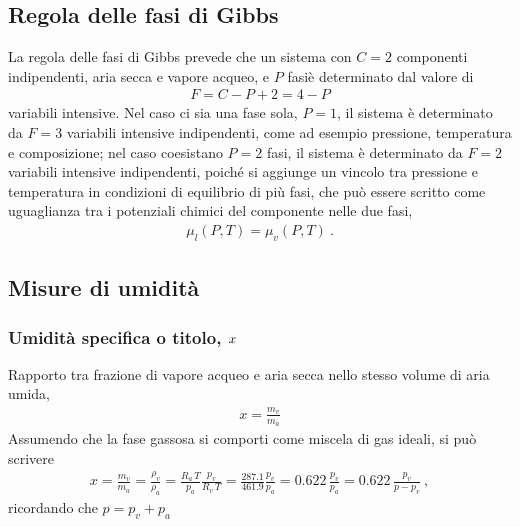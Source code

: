 \documentclass[letterpaper,10pt,italian]{jupyterBook}
\begin{document}
\subsection{Regola delle fasi di Gibbs}
\label{\detokenize{ch/thermodynamics/humid-air:regola-delle-fasi-di-gibbs}}
\sphinxAtStartPar
La regola delle fasi di Gibbs prevede che un sistema con \(C=2\) componenti indipendenti, aria secca e vapore acqueo, e \(P\) fasiè determinato dal valore di
\begin{equation*}
\begin{split}F = C - P + 2 = 4 - P \end{split}
\end{equation*}
\sphinxAtStartPar
variabili intensive. Nel caso ci sia una fase sola, \(P=1\), il sistema è determinato da \(F = 3\) variabili intensive indipendenti, come ad esempio pressione, temperatura e composizione; nel caso coesistano \(P=2\) fasi, il sistema è determinato da \(F = 2\) variabili intensive indipendenti, poiché si aggiunge un vincolo tra pressione e temperatura in condizioni di equilibrio di più fasi, che può essere scritto come uguaglianza tra i potenziali chimici del componente nelle due fasi,
\begin{equation*}
\begin{split}\mu_{l}(P,T) = \mu_{v}(P,T) \ .\end{split}
\end{equation*}

\subsection{Misure di umidità}
\label{\detokenize{ch/thermodynamics/humid-air:misure-di-umidita}}

\subsubsection{Umidità specifica o titolo, \protect\(x\protect\)}
\label{\detokenize{ch/thermodynamics/humid-air:umidita-specifica-o-titolo-x}}
\sphinxAtStartPar
Rapporto tra frazione di vapore acqueo e aria secca nello stesso volume di aria umida,
\begin{equation*}
\begin{split}x = \frac{m_v}{m_a}\end{split}
\end{equation*}
\sphinxAtStartPar
Assumendo che la fase gassosa si comporti come miscela di gas ideali, si può scrivere
\begin{equation*}
\begin{split}x = \frac{m_v}{m_a} = \frac{\rho_v}{\rho_a} = \frac{R_a \, T}{p_a} \frac{p_v}{R_v \, T} = \frac{287.1}{461.9} \frac{p_v}{p_a} = 0.622 \, \frac{p_v}{p_a} = 0.622 \, \frac{p_v}{p - p_v} \ ,\end{split}
\end{equation*}
\sphinxAtStartPar
ricordando che \(p = p_v + p_a\)
\end{document}
